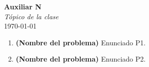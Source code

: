 \documentclass{article}
\begin{document}


\begin{center}
    \Huge{\textbf{Auxiliar N}}\\
    \textit{\large{Tópico de la clase}}\\
    \normalsize
	\today
\end{center}

\begin{enumerate}
    \item \textbf{(Nombre del problema)} Enunciado P1.
    \item \textbf{(Nombre del problema)} Enunciado P2.    
\end{enumerate}
\end{document}
